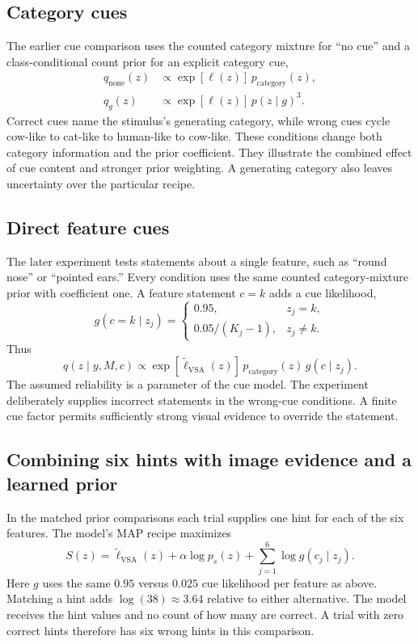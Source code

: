 \documentclass[11pt,letterpaper]{article}
\begin{document}
\subsection{Category cues}
The earlier cue comparison uses the counted category mixture for ``no cue'' and a class-conditional count prior for an explicit category cue,
\begin{align}
q_{\mathrm{none}}(z)&\propto\exp[\ell(z)]\,p_{\mathrm{category}}(z),\\
q_{g}(z)&\propto\exp[\ell(z)]\,p(z\mid g)^3.
\end{align}
Correct cues name the stimulus's generating category, while wrong cues cycle cow-like to cat-like to human-like to cow-like. These conditions change both category information and the prior coefficient. They illustrate the combined effect of cue content and stronger prior weighting. A generating category also leaves uncertainty over the particular recipe.

\subsection{Direct feature cues}
The later experiment tests statements about a single feature, such as ``round nose'' or ``pointed ears.'' Every condition uses the same counted category-mixture prior with coefficient one. A feature statement $c=k$ adds a cue likelihood,
\begin{equation}
g(c=k\mid z_j)=
\begin{cases}
0.95,&z_j=k,\\
0.05/(K_j-1),&z_j\ne k.
\end{cases}
\end{equation}
Thus
\begin{equation}
q(z\mid y,M,c)\propto
\exp[\widetilde\ell_{\mathrm{VSA}}(z)]\,
p_{\mathrm{category}}(z)\,g(c\mid z_j).
\label{eq:featurecue}
\end{equation}
The assumed reliability is a parameter of the cue model. The experiment deliberately supplies incorrect statements in the wrong-cue conditions. A finite cue factor permits sufficiently strong visual evidence to override the statement.

\subsection{Combining six hints with image evidence and a learned prior}
In the matched prior comparisons each trial supplies one hint for each of the six features. The model's MAP recipe maximizes
\begin{equation}
S(z)=\widetilde\ell_{\mathrm{VSA}}(z)+
\alpha\log p_s(z)+\sum_{j=1}^6\log g(c_j\mid z_j).
\end{equation}
Here $g$ uses the same $0.95$ versus $0.025$ cue likelihood per feature as above. Matching a hint adds $\log(38)\approx 3.64$ relative to either alternative. The model receives the hint values and no count of how many are correct. A trial with zero correct hints therefore has six wrong hints in this comparison.
\end{document}
